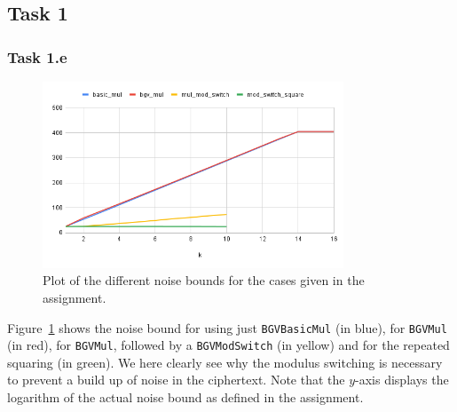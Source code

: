 \documentclass{article}
\author{Robin Martens}
\date{19/08/2023}
\begin{document}


\setcounter{page}{1}
\pagestyle{fancy}


\subsection*{Task 1}
\subsubsection*{Task 1.e}

\begin{figure}[htpb]
  \centering
  \includegraphics[width=0.8\textwidth]{./chart.png}
  \caption{Plot of the different noise bounds for the cases given in the
  assignment.}
  \label{fig:plot}
\end{figure}

Figure~\ref{fig:plot} shows the noise bound for using just \texttt{BGVBasicMul}
(in blue), for \texttt{BGVMul} (in red), for \texttt{BGVMul}, followed by a
\texttt{BGVModSwitch} (in yellow) and for the repeated squaring (in green). We
here clearly see why the modulus switching is necessary to prevent a build up of
noise in the ciphertext. Note that the $y$-axis displays the logarithm of the
actual noise bound as defined in the assignment.
\end{document}
